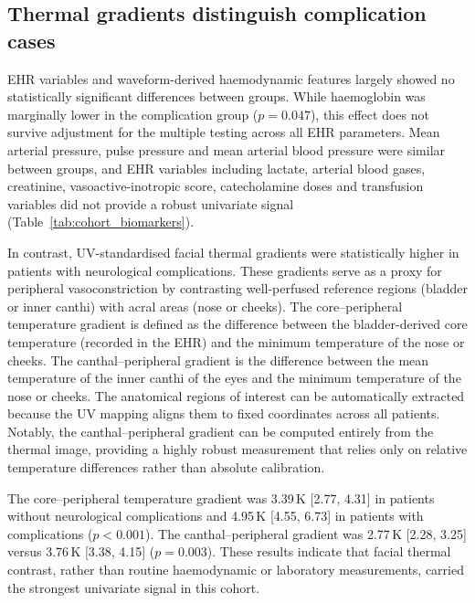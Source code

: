 \documentclass[11pt]{article}
\begin{document}
\subsection*{Thermal gradients distinguish complication cases}
EHR variables and waveform-derived haemodynamic features largely showed no statistically significant differences between groups. While haemoglobin was marginally lower in the complication group ($p=0.047$), this effect does not survive adjustment for the multiple testing across all EHR parameters. Mean arterial pressure, pulse pressure and mean arterial blood pressure were similar between groups, and EHR variables including lactate, arterial blood gases, creatinine, vasoactive-inotropic score, catecholamine doses and transfusion variables did not provide a robust univariate signal (Table~\ref{tab:cohort_biomarkers}).

In contrast, UV-standardised facial thermal gradients were statistically higher in patients with neurological complications. These gradients serve as a proxy for peripheral vasoconstriction by contrasting well-perfused reference regions (bladder or inner canthi) with acral areas (nose or cheeks). The core--peripheral temperature gradient is defined as the difference between the bladder-derived core temperature (recorded in the EHR) and the minimum temperature of the nose or cheeks. The canthal--peripheral gradient is the difference between the mean temperature of the inner canthi of the eyes and the minimum temperature of the nose or cheeks. The anatomical regions of interest can be automatically extracted because the UV mapping aligns them to fixed coordinates across all patients. Notably, the canthal--peripheral gradient can be computed entirely from the thermal image, providing a highly robust measurement that relies only on relative temperature differences rather than absolute calibration.

The core--peripheral temperature gradient was 3.39\,K [2.77, 4.31] in patients without neurological complications and 4.95\,K [4.55, 6.73] in patients with complications ($p<0.001$). The canthal--peripheral gradient was 2.77\,K [2.28, 3.25] versus 3.76\,K [3.38, 4.15] ($p=0.003$). These results indicate that facial thermal contrast, rather than routine haemodynamic or laboratory measurements, carried the strongest univariate signal in this cohort.
\end{document}
